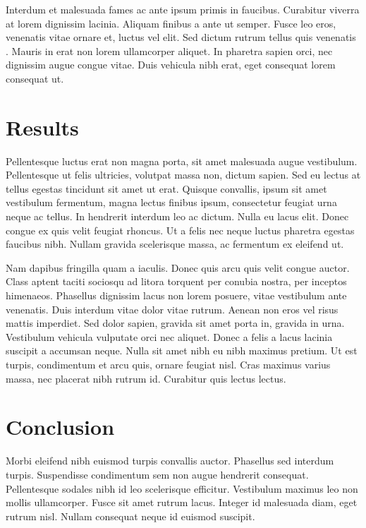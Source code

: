 \documentclass[onecolumn]{article}
\begin{document}
Interdum et malesuada fames ac ante ipsum primis in faucibus. Curabitur
viverra at lorem dignissim lacinia. Aliquam finibus a ante ut semper. Fusce
leo eros, venenatis vitae ornare et, luctus vel elit. Sed dictum rutrum
tellus quis venenatis\unskip~\cite{572698:13280063} . Mauris in erat non
lorem ullamcorper aliquet. In pharetra sapien orci, nec dignissim augue
congue vitae. Duis vehicula nibh erat, eget consequat lorem consequat ut.


    
\section*{Results}
Pellentesque luctus erat non magna porta, sit amet malesuada augue
vestibulum. Pellentesque ut felis ultricies, volutpat massa non, dictum
sapien. Sed eu lectus at tellus egestas tincidunt sit amet ut erat. Quisque
convallis, ipsum sit amet vestibulum fermentum, magna lectus finibus ipsum,
consectetur feugiat urna neque ac tellus. In hendrerit interdum leo ac
dictum. Nulla eu lacus elit. Donec congue ex quis velit feugiat rhoncus. Ut
a felis nec neque luctus pharetra egestas faucibus nibh. Nullam gravida
scelerisque massa, ac fermentum ex eleifend ut.

Nam dapibus fringilla quam a iaculis. Donec quis arcu quis velit congue
auctor. Class aptent taciti sociosqu ad litora torquent per conubia nostra,
per inceptos himenaeos. Phasellus dignissim lacus non lorem posuere, vitae
vestibulum ante venenatis. Duis interdum vitae dolor vitae rutrum. Aenean
non eros vel risus mattis imperdiet. Sed dolor sapien, gravida sit amet
porta in, gravida in urna. Vestibulum vehicula vulputate orci nec aliquet.
Donec a felis a lacus lacinia suscipit a accumsan neque. Nulla sit amet
nibh eu nibh maximus pretium. Ut est turpis, condimentum et arcu quis,
ornare feugiat nisl. Cras maximus varius massa, nec placerat nibh rutrum
id. Curabitur quis lectus lectus.


    
\section*{Conclusion}
Morbi eleifend nibh euismod turpis convallis auctor. Phasellus sed interdum
turpis. Suspendisse condimentum sem non augue hendrerit consequat.
Pellentesque sodales nibh id leo scelerisque efficitur. Vestibulum maximus
leo non mollis ullamcorper\cite{Vogel:1979}. Fusce sit amet rutrum lacus. Integer id
malesuada diam, eget rutrum nisl. Nullam consequat neque id euismod
suscipit.
\end{document}
